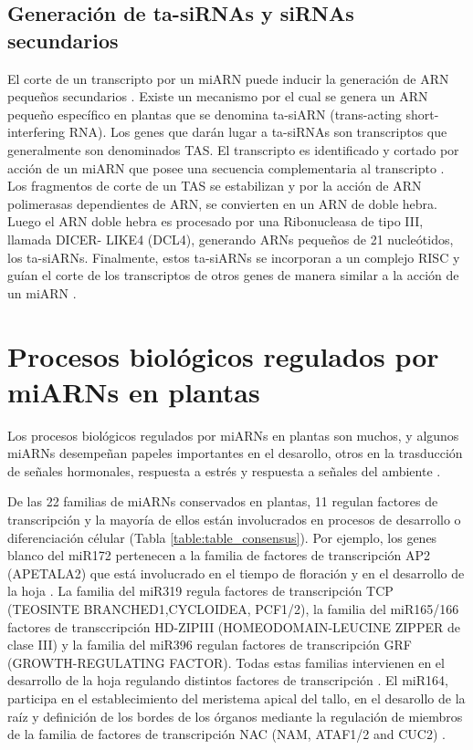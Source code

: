 \subsection{Generación de ta-siRNAs y siRNAs secundarios}
El corte de un transcripto por un miARN puede inducir la generación de ARN pequeños secundarios \citep{Allen2005207, pmid19066226,pmid19066226,pmid20643946,pmid20562854,pmid22308502}.
Existe un mecanismo por el cual se genera un ARN pequeño específico en plantas que se denomina ta-siARN (trans-acting short-interfering RNA).
Los genes que darán lugar a ta-siRNAs son transcriptos que generalmente son denominados TAS.
El transcripto es identificado y cortado por acción de un miARN que posee una secuencia complementaria al transcripto \citep{Allen2005207}.
Los fragmentos de corte de un TAS se estabilizan y por la acción de ARN polimerasas dependientes de ARN, se convierten en un ARN de doble hebra.
Luego el ARN doble hebra es procesado por una Ribonucleasa de tipo III, llamada DICER- LIKE4 (DCL4), generando ARNs pequeños de 21 nucleótidos, los ta-siARNs.
Finalmente, estos ta-siARNs se incorporan a un complejo RISC y guían el corte de los transcriptos de otros genes de manera similar a la acción de un miARN \citep{Allen2005207,pmid16040244,pmid16131612,Xie2005a}.


\section{Procesos biológicos regulados por miARNs en plantas}
Los procesos biológicos regulados por miARNs en plantas son muchos, y algunos miARNs desempeñan papeles importantes en el desarollo, otros en la trasducción de señales hormonales, respuesta a estrés y respuesta a señales del ambiente \citep{Voinnet2009669, pmid21466971, pmid19699140}.

De las 22 familias de miARNs conservados en plantas, 11 regulan factores de transcripción y la mayoría de ellos están involucrados en procesos de desarrollo o diferenciación célular \citep{Jones-Rhoades2006} (Tabla \ref{table:table_consensus}).
Por ejemplo, los genes blanco del miR172 pertenecen a la familia de factores de transcripción AP2 (APETALA2) que está involucrado en el tiempo de floración y en el desarrollo de la hoja \citep{pmid14555699, pmid12893888}.
La familia del miR319 regula factores de transcripción TCP (TEOSINTE BRANCHED1,CYCLOIDEA, PCF1/2), la familia del miR165/166 factores de transccripción HD-ZIPIII (HOMEODOMAIN-LEUCINE ZIPPER de clase III) y la familia del miR396 regulan factores de transcripción GRF (GROWTH-REGULATING FACTOR).
Todas estas familias intervienen en el desarrollo de la hoja regulando distintos factores de transcripción \citep{pmid12931144, pmid15351964, Rodriguez2010}.
El miR164, participa en el establecimiento del meristema apical del tallo, en el desarollo de la raíz y definición de los bordes de los órganos mediante la regulación de miembros de la familia de factores de transcripción NAC (NAM, ATAF1/2 and CUC2) \citep{laufus}.

